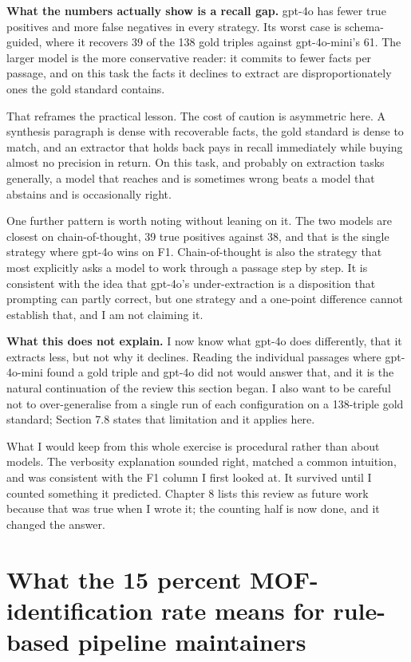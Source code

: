 \documentclass[11pt,a4paper,oneside]{report}
\begin{document}
\textbf{What the numbers actually show is a recall gap.} gpt-4o has fewer true positives and more false negatives in every strategy. Its worst case is schema-guided, where it recovers 39 of the 138 gold triples against gpt-4o-mini's 61. The larger model is the more conservative reader: it commits to fewer facts per passage, and on this task the facts it declines to extract are disproportionately ones the gold standard contains.

That reframes the practical lesson. The cost of caution is asymmetric here. A synthesis paragraph is dense with recoverable facts, the gold standard is dense to match, and an extractor that holds back pays in recall immediately while buying almost no precision in return. On this task, and probably on extraction tasks generally, a model that reaches and is sometimes wrong beats a model that abstains and is occasionally right.

One further pattern is worth noting without leaning on it. The two models are closest on chain-of-thought, 39 true positives against 38, and that is the single strategy where gpt-4o wins on F1. Chain-of-thought is also the strategy that most explicitly asks a model to work through a passage step by step. It is consistent with the idea that gpt-4o's under-extraction is a disposition that prompting can partly correct, but one strategy and a one-point difference cannot establish that, and I am not claiming it.

\textbf{What this does not explain.} I now know what gpt-4o does differently, that it extracts less, but not why it declines. Reading the individual passages where gpt-4o-mini found a gold triple and gpt-4o did not would answer that, and it is the natural continuation of the review this section began. I also want to be careful not to over-generalise from a single run of each configuration on a 138-triple gold standard; Section 7.8 states that limitation and it applies here.

What I would keep from this whole exercise is procedural rather than about models. The verbosity explanation sounded right, matched a common intuition, and was consistent with the F1 column I first looked at. It survived until I counted something it predicted. Chapter 8 lists this review as future work because that was true when I wrote it; the counting half is now done, and it changed the answer.

\section{What the 15 percent MOF-identification rate means for rule-based pipeline maintainers}
\end{document}
